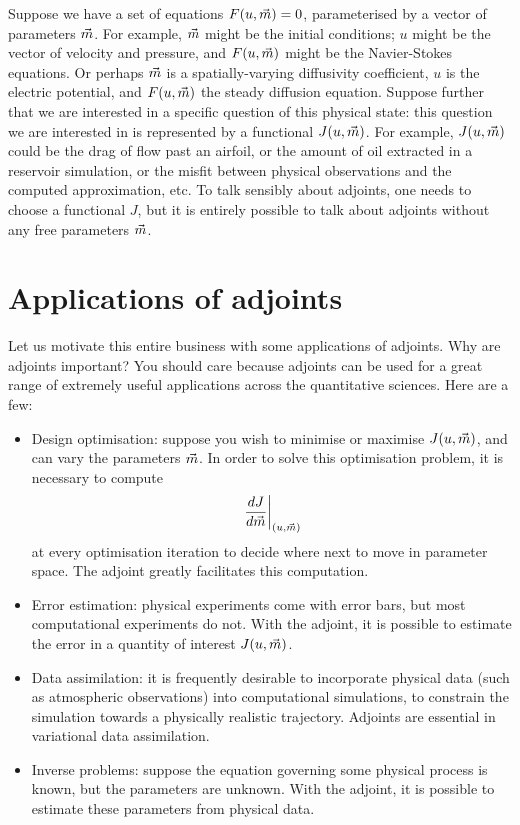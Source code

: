 Suppose we have a set of equations $F(u, {\vec{m}}) = 0$, parameterised by a vector of parameters ${\vec{m}}$. For example,
${\vec{m}}$ might be the initial conditions; $u$ might be the
vector of velocity and pressure, and $F(u, {\vec{m}})$ might be the Navier-Stokes equations. Or perhaps ${\vec{m}}$ is
a spatially-varying diffusivity coefficient, $u$ is the electric potential, and $F(u, {\vec{m}})$ the steady diffusion
equation. 
Suppose further that we are interested in a specific
question of this physical state: this question we are interested in is represented by a functional $J(u, {\vec{m}})$.
For example, $J(u, {\vec{m}})$ could be the drag of flow past an airfoil, or the amount of oil extracted in a reservoir simulation,
or the misfit between physical observations and the computed approximation, etc. To talk sensibly about adjoints, one needs to choose a functional
$J$, but it is entirely possible to talk about adjoints without any free parameters ${\vec{m}}$.

\section{Applications of adjoints}
Let us motivate this entire business with some applications of adjoints. Why are adjoints important?
You should care because adjoints can be used for a great
range of extremely useful applications across the quantitative sciences. Here are a few:
\begin{itemize}
\item Design optimisation: suppose you wish to minimise or maximise $J(u,{\vec{m}})$, and can vary the parameters ${\vec{m}}$.
In order to solve this optimisation problem, it is necessary to compute
\begin{equation}
\left.\frac{dJ}{d{\vec{m}}}\right|_{(u, {\vec{m}})}
\end{equation}
at every optimisation iteration to decide where next to move in parameter space. The adjoint greatly facilitates this
computation.
\item Error estimation: physical experiments come with error bars, but most computational experiments do not. With the
adjoint, it is possible to estimate the error in a quantity of interest $J(u,{\vec{m}})$.
\item Data assimilation: it is frequently desirable to incorporate physical data (such as atmospheric observations)
into computational simulations, to constrain the simulation towards a physically realistic trajectory. Adjoints are
essential in variational data assimilation.
\item Inverse problems: suppose the equation governing some physical process is known, but the parameters
are unknown. With the adjoint, it is possible to estimate these parameters
from physical data.
\end{itemize}

